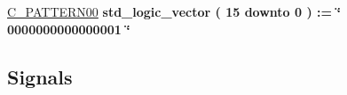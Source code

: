 \begin{DoxyCompactItemize}
\item 
\hyperlink{classalu_1_1rtl_a83d996bd260cfb3b49ca3b3f46bf0d32}{C\+\_\+\+P\+A\+T\+T\+E\+R\+N00} {\bfseries \textcolor{comment}{std\+\_\+logic\+\_\+vector}\textcolor{vhdlchar}{ }\textcolor{vhdlchar}{(}\textcolor{vhdlchar}{ }\textcolor{vhdlchar}{ } \textcolor{vhdldigit}{15} \textcolor{vhdlchar}{ }\textcolor{keywordflow}{downto}\textcolor{vhdlchar}{ }\textcolor{vhdlchar}{ } \textcolor{vhdldigit}{0} \textcolor{vhdlchar}{ }\textcolor{vhdlchar}{)}\textcolor{vhdlchar}{ }\textcolor{vhdlchar}{ }\textcolor{vhdlchar}{ }\textcolor{vhdlchar}{\+:}\textcolor{vhdlchar}{=}\textcolor{vhdlchar}{ }\textcolor{vhdlchar}{ }\textcolor{vhdlchar}{ }\textcolor{vhdlchar}{ }\textcolor{keyword}{\char`\"{} 0000000000000001 \char`\"{}}\textcolor{vhdlchar}{ }} 
\end{DoxyCompactItemize}
\subsection*{Signals}
